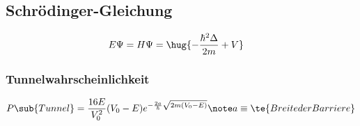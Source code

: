 \documentclass[twocolumn]{summery_4.0}
\begin{document}
\subsection{Schrödinger-Gleichung}
\begin{align*}
    E\Psi &= H\Psi = \hug{-\frac{\hbar^2\Delta}{2m}+V} 
\end{align*}
\subsubsection{Tunnelwahrscheinlichkeit}
\begin{align*}
    P\sub{Tunnel} = \frac{16E}{V_0^2}(V_0-E) e^{-\frac{2a}{\hbar} \sqrt{2m(V_0 -E)}}\note a \equiv \te{Breite der Barriere}
\end{align*}
\end{document}
